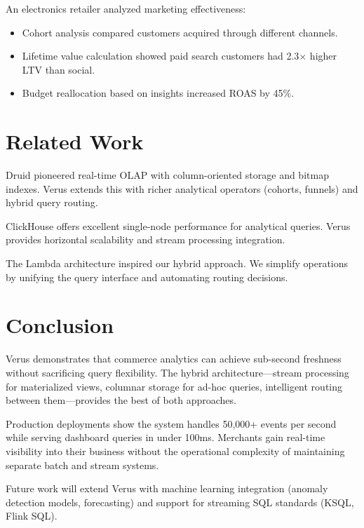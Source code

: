 \documentclass[11pt,twocolumn]{article}
\begin{document}
An electronics retailer analyzed marketing effectiveness:

\begin{itemize}
\item Cohort analysis compared customers acquired through different channels.
\item Lifetime value calculation showed paid search customers had 2.3$\times$ higher LTV than social.
\item Budget reallocation based on insights increased ROAS by 45\%.
\end{itemize}

\section{Related Work}

Druid \cite{druid2014} pioneered real-time OLAP with column-oriented storage and bitmap indexes. Verus extends this with richer analytical operators (cohorts, funnels) and hybrid query routing.

ClickHouse \cite{clickhouse2016} offers excellent single-node performance for analytical queries. Verus provides horizontal scalability and stream processing integration.

The Lambda architecture \cite{marz2015} inspired our hybrid approach. We simplify operations by unifying the query interface and automating routing decisions.

\section{Conclusion}

Verus demonstrates that commerce analytics can achieve sub-second freshness without sacrificing query flexibility. The hybrid architecture—stream processing for materialized views, columnar storage for ad-hoc queries, intelligent routing between them—provides the best of both approaches.

Production deployments show the system handles 50,000+ events per second while serving dashboard queries in under 100ms. Merchants gain real-time visibility into their business without the operational complexity of maintaining separate batch and stream systems.

Future work will extend Verus with machine learning integration (anomaly detection models, forecasting) and support for streaming SQL standards (KSQL, Flink SQL).
\end{document}
